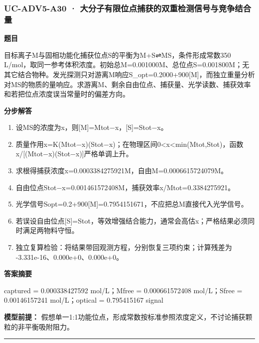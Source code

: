 \documentclass[UTF8,11pt,a4paper]{ctexart}
\begin{document}
\subsubsection*{UC-ADV5-A30 · 大分子有限位点捕获的双重检测信号与竞争结合量}
\noindent\textbf{题目}\par
目标离子M与固相功能化捕获位点S的平衡为M+S⇌MS，条件形成常数350 L/mol，取同一参考体积浓度。初始总M=0.001000M、总位点S=0.001800M；无其它结合物种。发光探测只对游离M响应S\_opt=0.2000+900[M]，而独立重量分析对MS的物质的量响应。求游离M、剩余自由位点、捕获量、光学读数、捕获效率和若把位点浓度误当常量时的偏差方向。\par
\medskip\noindent\textbf{分步解答}
\begin{enumerate}
\item 设MS的浓度为x，则[M]=Mtot−x，[S]=Stot−x。
\item 质量作用x=K(Mtot−x)(Stot−x)；在物理区间0<x<min(Mtot,Stot)，函数x/[(Mtot−x)(Stot−x)]严格单调上升。
\item 求根得捕获浓度x=0.0003384275921M，自由M=0.0006615724079M。
\item 自由位点Stot−x=0.001461572408M，捕获效率x/Mtot=0.3384275921。
\item 光学信号Sopt=0.2+900[M]=0.7954151671，不应把总M直接代入光学信号。
\item 若误设自由位点[S]=Stot，等效增强结合能力，通常会高估x；严格结果必须同时满足两物料守恒。
\item 独立复算检验：将结果带回观测方程，分别恢复三项约束；计算残差为 -3.331e-16、0.000e+0、0.000e+0。
\end{enumerate}
\noindent\textbf{答案摘要}\par
captured = 0.000338427592 mol/L；Mfree = 0.000661572408 mol/L；Sfree = 0.00146157241 mol/L；optical = 0.795415167 signal\par
\noindent\textbf{模型前提：}
假想单一1:1功能位点，形成常数按标准参照浓度定义，不讨论捕获颗粒的非平衡吸附阻力。\par
\medskip\hrule\medskip
{}
\end{document}
